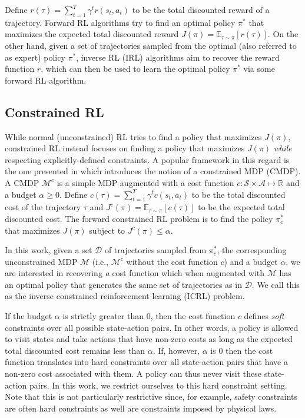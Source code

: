 \documentclass{article}
\begin{document}
Define $r(\tau) = \sum_{t=1}^T \gamma^t r(s_t,a_t)$ to be the total discounted reward of a trajectory. Forward RL algorithms try to find an optimal policy $\pi^*$ that maximizes the expected total discounted reward $J(\pi) = \mathbb{E}_{\tau \sim \pi}[r(\tau)]$. On the other hand, given a set of trajectories sampled from the optimal (also referred to as expert) policy $\pi^*$, inverse RL (IRL) algorithms aim to recover the reward function $r$, which can then be used to learn the optimal policy $\pi^*$ via some forward RL algorithm.

\subsection{Constrained RL}
\label{sec:crl}
While normal (unconstrained) RL tries to find a policy that maximizes $J(\pi)$, constrained RL instead focuses on finding a policy that maximizes $J(\pi)$ \textit{while} respecting explicitly-defined constraints. A popular framework in this regard is the one presented in \citet{altman1999cmdps} which introduces the notion of a constrained MDP (CMDP). A CMDP $\mathcal{M}^c$ is a simple MDP augmented with a cost function $c:\mathcal{S}\times\mathcal{A} \mapsto \mathbb{R}$ and a budget $\alpha \geq 0$. Define $c(\tau)=\sum_{t=1}^T \gamma^t c(s_t,a_t)$ to be the total discounted cost of the trajectory $\tau$ and $J^{c}(\pi)=\mathbb{E}_{\tau\sim\pi}[c(\tau)]$ to be the expected total discounted cost. The forward constrained RL problem is to find the policy $\pi_c^*$ that maximizes $J(\pi)$ subject to $J^c(\pi) \leq \alpha$.

In this work, given a set $\mathcal{D}$ of trajectories sampled from $\pi_c^*$, the corresponding unconstrained MDP $\mathcal{M}$ (i.e., $\mathcal{M}^c$ without the cost function $c$) and a budget $\alpha$, we are interested in recovering \textit{a} cost function which when augmented with $\mathcal{M}$ has an optimal policy that generates the same set of trajectories as in $\mathcal{D}$. We call this as the inverse constrained reinforcement learning (ICRL) problem.

If the budget $\alpha$ is strictly greater than $0$, then the cost function $c$ defines \textit{soft} constraints over all possible state-action pairs. In other words, a policy is allowed to visit states and take actions that have non-zero costs as long as the expected total discounted cost remains less than $\alpha$. If, however, $\alpha$ is $0$ then the cost function translates into hard constraints over all state-action pairs that have a non-zero cost associated with them. A policy can thus never visit these state-action pairs. In this work, we restrict ourselves to this hard constraint setting. Note that this is not particularly restrictive since, for example, safety constraints are often hard constraints as well are constraints imposed by physical laws.
\end{document}
